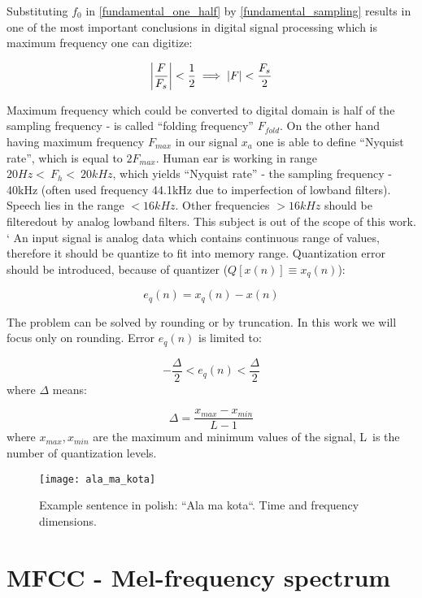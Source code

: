 Substituting $f_0$ in \eqref{fundamental_one_half} by \eqref{fundamental_sampling} results in one of the most important conclusions in digital signal processing which is maximum frequency one can digitize:

\begin{equation}
	\abs*{\frac{F}{F_s}} < \frac{1}{2} \implies \abs{F} < \frac{F_s}{2}
\end{equation}
 

Maximum frequency which could be converted to digital domain is half of the sampling frequency - is called ``folding frequency'' $F_{fold}$. On the other hand having maximum frequency $F_{max}$ in our signal $x_a$ one is able to define ``Nyquist rate'', which is equal to $2 F_{max}$. Human ear is working in range $20 Hz <~F_h <~20kHz$, which yields ``Nyquist rate'' - the sampling frequency - 40kHz (often used frequency 44.1kHz due to imperfection of low\dywiz band filters). Speech lies in the range $< 16kHz$. Other frequencies $> 16kHz$ should be filtered\dywiz out by analog low\dywiz band filters. This subject is out of the scope of this work. 
`
An input signal is analog data which contains continuous range of values, therefore it should be quantize to fit into memory range. Quantization error should be introduced, because of quantizer ($Q[x(n)] \equiv x_q(n)$):

\begin{equation}
e_q(n) = x_q(n) - x(n)
\end{equation}

The problem can be solved by rounding or by truncation. In this work we will focus only on rounding. Error $e_q(n)$ is limited to:


\begin{equation}
	-\frac{\Delta}{2} < e_q(n) < \frac{\Delta}{2}
\end{equation}
where $\Delta$ means:

\begin{equation}
	\Delta = \frac{x_{max}-x_{min}}{L-1}
\end{equation}
where $x_{max}, x_{min}$ are the maximum and minimum values of the signal, L~is the number of quantization levels.

\begin{figure}[h]
\label{f:ala_ma_kota}
\texttt{[image: ala\_ma\_kota]}
\caption{Example sentence in polish: ``Ala ma kota``. Time and frequency dimensions.}
\end{figure}

\section{MFCC - Mel-frequency spectrum}

